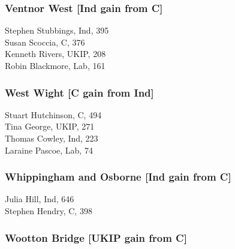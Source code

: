 \documentclass[a4paper,openany,10pt]{book}
\begin{document}
\subsubsection*{Ventnor West \hspace*{\fill}\nolinebreak[1]%
\enspace\hspace*{\fill}
[Ind gain from C]}



Stephen Stubbings, Ind, 395\\
Susan Scoccia, C, 376\\
Kenneth Rivers, UKIP, 208\\
Robin Blackmore, Lab, 161\\


\subsubsection*{West Wight \hspace*{\fill}\nolinebreak[1]%
\enspace\hspace*{\fill}
[C gain from Ind]}



Stuart Hutchinson, C, 494\\
Tina George, UKIP, 271\\
Thomas Cowley, Ind, 223\\
Laraine Pascoe, Lab, 74\\


\subsubsection*{Whippingham and Osborne \hspace*{\fill}\nolinebreak[1]%
\enspace\hspace*{\fill}
[Ind gain from C]}



Julia Hill, Ind, 646\\
Stephen Hendry, C, 398\\


\subsubsection*{Wootton Bridge \hspace*{\fill}\nolinebreak[1]%
\enspace\hspace*{\fill}
[UKIP gain from C]}
\end{document}
